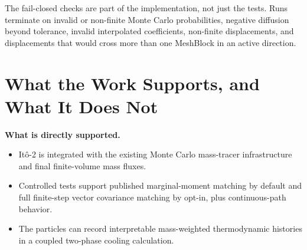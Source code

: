 \documentclass[11pt]{article}
\newcommand{\Ito}{It\^o}
\begin{document}
The fail-closed checks are part of the implementation, not just the tests.
Runs terminate on invalid or non-finite Monte Carlo probabilities, negative
diffusion beyond tolerance, invalid interpolated coefficients, non-finite
displacements, and displacements that would cross more than one MeshBlock in
an active direction.

\section{What the Work Supports, and What It Does Not}

\textbf{What is directly supported.}
\begin{itemize}
  \item \Ito{}-2 is integrated with the existing Monte Carlo mass-tracer
        infrastructure and final finite-volume mass fluxes.
  \item Controlled tests support published marginal-moment matching by
        default and full finite-step vector covariance matching by opt-in,
        plus continuous-path behavior.
  \item The particles can record interpretable mass-weighted thermodynamic
        histories in a coupled two-phase cooling calculation.
\end{itemize}
\end{document}
